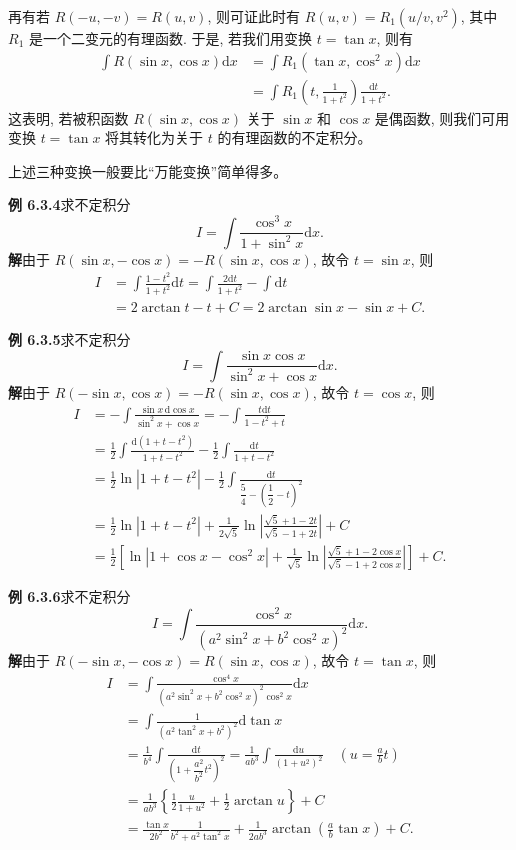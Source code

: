 \documentclass[UTF8, 12pt, fontset=fandol, oneside]{ctexart}
\begin{document}
再有若 $R(-u,-v)=R(u,v)$, 则可证此时有 $R(u,v)=R_1(u/v,v^2)$, 其中 $R_1$ 是一个二变元的有理函数. 于是, 若我们用变换 $t=\tan x$, 则有
\[
\begin{aligned}
  \int R(\sin x,\cos x)\mathrm dx
  &=
  \int R_1(\tan x,\cos^2x)\mathrm dx\\
  &=
  \int R_1\left(t,\frac1{1+t^2}\right)\frac{\mathrm dt}{1+t^2}.
\end{aligned}
\]
这表明, 若被积函数 $R(\sin x,\cos x)$ 关于 $\sin x$ 和 $\cos x$ 是偶函数, 则我们可用变换 $t=\tan x$ 将其转化为关于 $t$ 的有理函数的不定积分。

上述三种变换一般要比``万能变换''简单得多。

\noindent\textbf{例 6.3.4}\quad 求不定积分
\[
  I=\int\frac{\cos^3x}{1+\sin^2x}\mathrm dx.
\]
\noindent\textbf{解}\quad 由于 $R(\sin x,-\cos x)=-R(\sin x,\cos x)$, 故令 $t=\sin x$, 则
\[
\begin{aligned}
  I
  &=
  \int\frac{1-t^2}{1+t^2}\mathrm dt
  =
  \int\frac{2\mathrm dt}{1+t^2}-\int\mathrm dt\\
  &=
  2\arctan t-t+C
  =
  2\arctan\sin x-\sin x+C.
\end{aligned}
\]

\noindent\textbf{例 6.3.5}\quad 求不定积分
\[
  I=\int\frac{\sin x\cos x}{\sin^2x+\cos x}\mathrm dx.
\]
\noindent\textbf{解}\quad 由于 $R(-\sin x,\cos x)=-R(\sin x,\cos x)$, 故令 $t=\cos x$, 则
\[
\begin{aligned}
  I
  &=
  -\int\frac{\sin x\,\mathrm d\cos x}{\sin^2x+\cos x}
  =
  -\int\frac{t\mathrm dt}{1-t^2+t}\\
  &=
  \frac12\int\frac{\mathrm d(1+t-t^2)}{1+t-t^2}
  -\frac12\int\frac{\mathrm dt}{1+t-t^2}\\
  &=
  \frac12\ln|1+t-t^2|-\frac12\int\frac{\mathrm dt}{\dfrac54-\left(\dfrac12-t\right)^2}\\
  &=
  \frac12\ln|1+t-t^2|+
  \frac1{2\sqrt5}\ln\left|\frac{\sqrt5+1-2t}{\sqrt5-1+2t}\right|+C\\
  &=
  \frac12\left[
  \ln|1+\cos x-\cos^2x|+
  \frac1{\sqrt5}\ln\left|\frac{\sqrt5+1-2\cos x}{\sqrt5-1+2\cos x}\right|
  \right]+C.
\end{aligned}
\]

\noindent\textbf{例 6.3.6}\quad 求不定积分
\[
  I=\int\frac{\cos^2x}{(a^2\sin^2x+b^2\cos^2x)^2}\mathrm dx.
\]
\noindent\textbf{解}\quad 由于 $R(-\sin x,-\cos x)=R(\sin x,\cos x)$, 故令 $t=\tan x$, 则
\[
\begin{aligned}
  I
  &=
  \int\frac{\cos^4x}{(a^2\sin^2x+b^2\cos^2x)^2\cos^2x}\mathrm dx\\
  &=
  \int\frac{1}{(a^2\tan^2x+b^2)^2}\mathrm d\tan x\\
  &=
  \frac1{b^4}\int\frac{\mathrm dt}{\left(1+\dfrac{a^2}{b^2}t^2\right)^2}
  =
  \frac1{ab^3}\int\frac{\mathrm du}{(1+u^2)^2}\quad\left(u=\frac abt\right)\\
  &=
  \frac1{ab^3}\left\{\frac12\frac u{1+u^2}+\frac12\arctan u\right\}+C\\
  &=
  \frac{\tan x}{2b^2}\frac1{b^2+a^2\tan^2x}
  +\frac1{2ab^3}\arctan\left(\frac ab\tan x\right)+C.
\end{aligned}
\]
\end{document}
